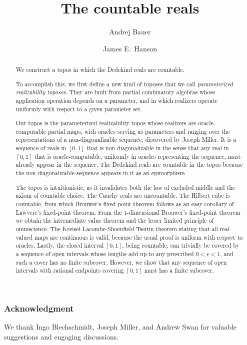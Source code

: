 \documentclass[12pt]{amsart}
\title{The countable reals}
\author{Andrej Bauer}
\author{James E.~Hanson}
\numberwithin{equation}{section}
\begin{document}
\begin{abstract}
  We construct a topos in which the Dedekind reals are countable.

  To accomplish this, we first define a new kind of toposes that we call \emph{parameterized realizability toposes}. They are built from partial combinatory algebras whose application operation depends on a parameter, and in which realizers operate uniformly with respect to a given parameter set.

  Our topos is the parameterized realizability topos whose realizers are oracle-computable partial maps, with oracles serving as parameters and ranging over the representations of a non-diagonalizable sequence, discovered by Joseph Miller. It is a sequence of reals in $[0,1]$ that is non-diagonalizable in the sense that any real in $[0,1]$ that is oracle-computable, uniformly in oracles representing the sequence, must already appear in the sequence.
  The Dedekind reals are countable in the topos because the non-diagonalizable sequence appears in it as an epimorphism.

  The topos is intuitionistic, as it invalidates both the law of excluded middle and the axiom of countable choice. The Cauchy reals are uncountable. The Hilbert cube is countable, from which Brouwer's fixed-point theorem follows as an easy corollary of Lawvere's fixed-point theorem. From the 1-dimensional Brouwer's fixed-point theorem we obtain the intermediate value theorem and the lesser limited principle of omniscience. The Kreisel-Lacombe-Shoenfield-Tseitin theorem stating that all real-valued maps are continuous is valid, because the usual proof is uniform with respect to oracles.
  Lastly, the closed interval $[0,1]$, being countable, can trivially be covered by a sequence of open intervals whose lengths add up to any prescribed $0 < \epsilon < 1$, and such a cover has no finite subcover.
  However, we show that any sequence of open intervals with rational endpoints covering $[0,1]$ must has a finite subcover.
\end{abstract}

\maketitle









\subsubsection*{Acknowledgment}

We thank Ingo Blechschmidt, Joseph Miller, and Andrew Swan for valuable suggestions and engaging discussions.


% 




\appendix
%
\end{document}
